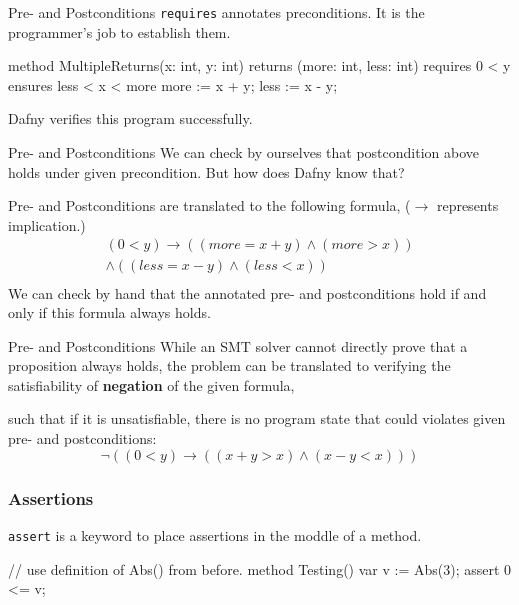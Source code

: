 \documentclass[10pt, compress]{beamer}
\begin{document}
\begin{frame}[fragile]{Pre- and Postconditions}
  \verb|requires| annotates preconditions. It is the programmer's job to establish them.
  \begin{verbnobox}[\footnotesize]
method MultipleReturns(x: int, y: int)
returns (more: int, less: int)
   requires 0 < y
   ensures less < x < more
{
   more := x + y;
   less := x - y;
}

  \end{verbnobox}
  Dafny verifies this program successfully.

\end{frame}

\begin{frame}[fragile]{Pre- and Postconditions}
  We can check by ourselves that postcondition above holds under given precondition. But how does Dafny know that?

  Pre- and Postconditions are translated to the following formula, ($\to$ represents implication.)
  \begin{align*}
    (0 < y) \to ((more = x + y) \land (more > x)) \\
            \land ((less = x - y) \land (less < x)) \\
  \end{align*}
  We can check by hand that the annotated pre- and postconditions hold if and only if this formula always holds. 
\end{frame}

\begin{frame}[fragile]{Pre- and Postconditions}
  While an SMT solver cannot directly prove that a proposition always holds, the problem can be translated to verifying the satisfiability of \textbf{negation} of the given formula,

  such that if it is unsatisfiable, there is no program state that could violates given pre- and postconditions:
    $$\neg((0 < y) \to ((x + y > x) \land (x - y < x)))$$
\end{frame}

\begin{frame}[fragile]
  \frametitle{Assertions}
  \verb|assert| is a keyword to place assertions in the moddle of a method.
  \begin{verbnobox}[\footnotesize]
// use definition of Abs() from before.
method Testing()
{
   var v := Abs(3);
   assert 0 <= v;
}
  \end{verbnobox}
\end{frame}
\end{document}
